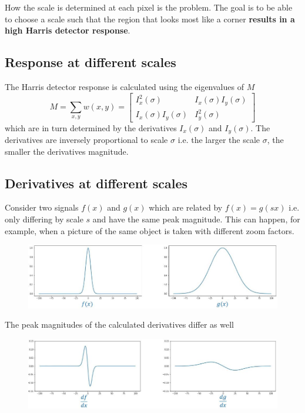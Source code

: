 \documentclass{report}
\begin{document}
How the scale is determined at each pixel is the problem. The goal is to be able
to choose a scale such that the region that looks most like a corner
\textbf{results in a high Harris detector response}.

\subsection{Response at different scales}

The Harris detector response is calculated using the eigenvalues of $M$
$$
    M = \sum_{x,y} w(x,y) = \begin{bmatrix}
        I_x^2(\sigma) & I_x(\sigma) I_y(\sigma) \\ 
        I_x(\sigma) I_y(\sigma) & I_y^2(\sigma)
    \end{bmatrix}
$$
which are in turn determined by the derivatives $I_x(\sigma)$ and $I_y(\sigma)$.
The derivatives are inversely proportional to scale $\sigma$  i.e. the larger
the scale $\sigma$, the smaller the derivatives magnitude.

\pagebreak

\subsection{Derivatives at different scales}

Consider two signals $f(x)$ and $g(x)$ which are related by $f(x) = g(sx)$ i.e.
only differing by scale $s$ and have the same peak magnitude.  This can happen,
for example, when a picture of the same object is taken with different zoom
factors.  
\begin{figure}[h]
    \centering
    \includegraphics[width=12cm]{Different zoom.JPG}
\end{figure}

The peak magnitudes of the calculated derivatives differ as well
\begin{figure}[h]
    \centering
    \includegraphics[width=12cm]{Derivative peak.JPG}
\end{figure}
\end{document}

